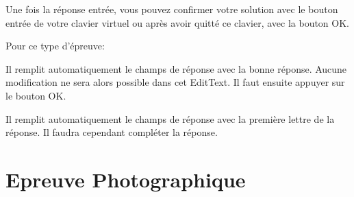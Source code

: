 \documentclass[11pt]{scrreprt}
\begin{document}
    Une fois la réponse entrée, vous pouvez confirmer votre solution avec le bouton entrée de votre clavier virtuel ou après avoir quitté ce clavier, avec la bouton OK.

    Pour ce type d'épreuve:
    \begin{description}[style=nextline]
        \item[Bouton de triche]Il remplit automatiquement le champs de réponse avec la bonne réponse. Aucune modification ne sera alors possible dans cet EditText. Il faut ensuite appuyer sur le bouton OK.
        \item[Bouton d'aide]Il remplit automatiquement le champs de réponse avec la première lettre de la réponse. Il faudra cependant compléter la réponse.
    \end{description}

    \section{Epreuve Photographique}
\end{document}

